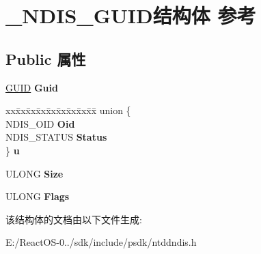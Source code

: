 \hypertarget{struct___n_d_i_s___g_u_i_d}{}\section{\+\_\+\+N\+D\+I\+S\+\_\+\+G\+U\+I\+D结构体 参考}
\label{struct___n_d_i_s___g_u_i_d}
\subsection*{Public 属性}
\begin{DoxyCompactItemize}
\item 
\mbox{\label{struct___n_d_i_s___g_u_i_d_a1e65ab269accc734eaf34e92b780d01a}} 
\hyperlink{interface_g_u_i_d}{G\+U\+ID} {\bfseries Guid}
\item 
\mbox{\label{struct___n_d_i_s___g_u_i_d_a7fb5119ae0434f6bc72a9c1cea0c6ea1}} 
\begin{tabbing}
xx\=xx\=xx\=xx\=xx\=xx\=xx\=xx\=xx\=\kill
union \{\\
\>NDIS\_OID {\bfseries Oid}\\
\>NDIS\_STATUS {\bfseries Status}\\
\} {\bfseries u}\\

\end{tabbing}\item 
\mbox{\label{struct___n_d_i_s___g_u_i_d_a4fc11d18062beaadc3cd3f6773c0c82b}} 
U\+L\+O\+NG {\bfseries Size}
\item 
\mbox{\label{struct___n_d_i_s___g_u_i_d_a5b8a0e4cb66d4e7dde8ad27f0487e431}} 
U\+L\+O\+NG {\bfseries Flags}
\end{DoxyCompactItemize}


该结构体的文档由以下文件生成\+:\begin{DoxyCompactItemize}
\item 
E\+:/\+React\+O\+S-\/0../sdk/include/psdk/ntddndis.\+h\end{DoxyCompactItemize}

